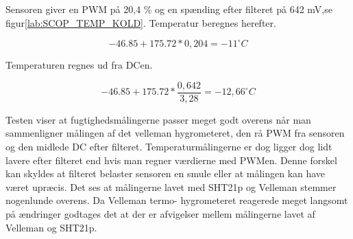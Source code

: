 Sensoren giver en PWM på 20,4 \% og en spænding efter filteret på 642 mV,se figur\ref{lab:SCOP_TEMP_KOLD}. Temperatur beregnes herefter.


\begin{equation}
-46.85+175.72*0,204=-11^{\circ}C
\end{equation}

Temperaturen regnes ud fra DCen. 

\begin{equation}
-46.85+175.72*\frac{0,642}{3,28}=-12,66^{\circ}C
\end{equation}


Testen viser at fugtighedsmålingerne passer meget godt overens når man sammenligner målingen af det velleman hygrometeret, den rå PWM fra sensoren og den midlede DC efter filteret. Temperaturmålingerne er dog ligger dog lidt lavere efter filteret end hvis man regner værdierne med PWMen. Denne forskel kan skyldes at filteret belaster sensoren en smule eller at målingen kan have været upræcis. Det ses at målingerne lavet med SHT21p og Velleman stemmer nogenlunde overens. Da Velleman termo- hygrometeret reagerede meget langsomt på ændringer godtages det at der er afvigelser mellem målingerne lavet af Velleman og SHT21p. 

